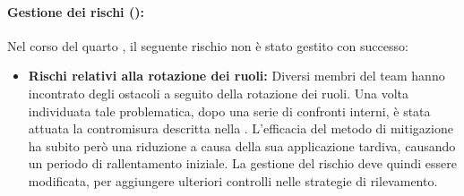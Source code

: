 \paragraph*{Gestione dei rischi ():}
\par Nel corso del quarto , il seguente rischio non è stato gestito con successo:
\begin{itemize}
  \item \textbf{Rischi relativi alla rotazione dei ruoli:} Diversi membri del team hanno incontrato degli ostacoli a seguito della rotazione dei ruoli. Una volta individuata tale problematica, dopo una serie di confronti interni, è stata attuata la contromisura descritta nella . L'efficacia del metodo di mitigazione ha subito però una riduzione a causa della sua applicazione tardiva, causando un periodo di rallentamento iniziale. La gestione del rischio deve quindi essere modificata, per aggiungere ulteriori controlli nelle strategie di rilevamento.
\end{itemize}